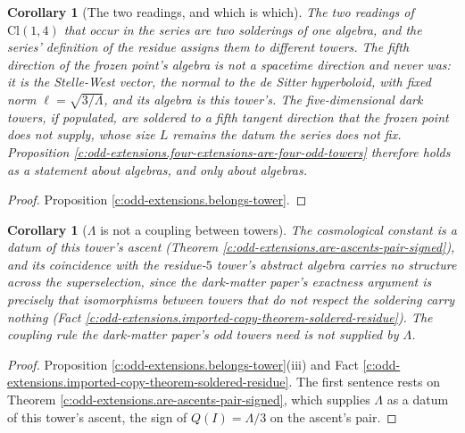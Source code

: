 \documentclass[11pt]{article}
\newtheorem{corollary}[theorem]{Corollary}
\theoremstyle{definition}
\theoremstyle{plain}
\newcommand{\changedmark}[2]{\marginpar{\raggedright\scriptsize\color{#1}#2}}
\providecommand{\Cl}{}\renewcommand{\Cl}{\mathrm{Cl}}
\begin{document}
\begin{corollary}[The two readings, and which is which]\label{c:odd-extensions.two-readings-which-which}
The two readings of $\Cl(1,4)$ that occur in the series are two solderings of one algebra, and the series' definition of the residue assigns them to different towers. The fifth direction of the frozen point's algebra is not a spacetime direction and never was: it is the Stelle-West vector, the normal to the de Sitter hyperboloid, with fixed norm $\ell = \sqrt{3/\Lambda}$, and its algebra is this tower's. The five-dimensional dark towers, if populated, are soldered to a fifth tangent direction that the frozen point does not supply, whose size $L$ remains the datum the series does not fix. Proposition \ref{c:odd-extensions.four-extensions-are-four-odd-towers} therefore holds as a statement about algebras, and only about algebras.
\end{corollary}
\begin{proof}
Proposition \ref{c:odd-extensions.belongs-tower}.

\end{proof}

\begin{corollary}[$\Lambda$ is not a coupling between towers]\label{c:odd-extensions.not-coupling-between-towers}
\changedmark{gray}{reworded}
The cosmological constant is a datum of this tower's ascent (Theorem \ref{c:odd-extensions.are-ascents-pair-signed}), and its coincidence with the residue-$5$ tower's abstract algebra carries no structure across the superselection, since the dark-matter paper's exactness argument is precisely that isomorphisms between towers that do not respect the soldering carry nothing (Fact \ref{c:odd-extensions.imported-copy-theorem-soldered-residue}). The coupling rule the dark-matter paper's odd towers need is not supplied by $\Lambda$.
\end{corollary}
\begin{proof}
Proposition \ref{c:odd-extensions.belongs-tower}(iii) and Fact \ref{c:odd-extensions.imported-copy-theorem-soldered-residue}. The first sentence rests on Theorem \ref{c:odd-extensions.are-ascents-pair-signed}, which supplies $\Lambda$ as a datum of this tower's ascent, the sign of $Q(I) = \Lambda/3$ on the ascent's pair.

\end{proof}
\end{document}
